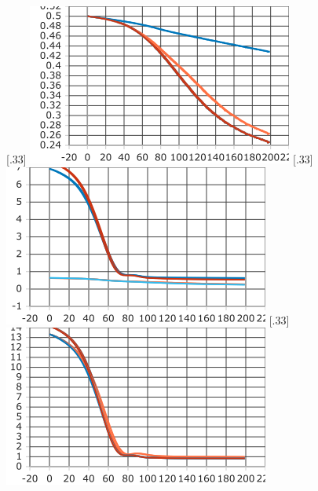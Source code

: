 \begin{figure}[ht]
    [.33\linewidth]{%
        \includegraphics[width=\linewidth]{./figures/training_Factorization_Loss}%
    }
    [.33\linewidth]{%
        \includegraphics[width=\linewidth]{./figures/training_Joint_Loss}%
    }
    [.33\linewidth]{%
    \includegraphics[width=\linewidth]{./figures/training_MSE}%
}
\end{figure}
